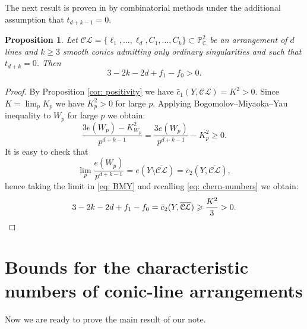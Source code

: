 \documentclass[12pt]{amsart}
\theoremstyle{plain}
\newtheorem{proposition}[thm]{Proposition}
\theoremstyle{definition}
\renewcommand\ge{\geqslant}
\renewcommand\geq{\geqslant}
\newcommand\CL{\mathcal{CL}}
\newcommand\oCL{\overline{\mathcal{CL}}}
\begin{document}
The next result is proven in \cite[Proposition~6.2]{PSz2023} by combinatorial methods under the additional assumption that $t_{d+k-1}=0$.
\begin{proposition}\label{prop: c2}
Let $\mathcal{CL} = \{\ell_{1}, \dots, \ell_{d}, C_{1}, \dots, C_{k}\} \subset \mathbb{P}^{2}_{\mathbb{C}}$ be an arrangement of $d$ lines and $k\geq 3$ smooth conics admitting only ordinary singularities and such that $t_{d+k}=0$. 
Then
  $$3-2k-2d+f_{1}-f_{0}>0.$$
\end{proposition}
\begin{proof} By Proposition  \ref{cor: positivity} we have $\bar c_1(Y,\CL)=K^2>0$. Since $K=\lim_pK_p$ we have $K_p^2>0$ for large $p$. Applying Bogomolov--Miyaoka--Yau inequality to $W_p$ for large $p$ we obtain:
\begin{equation}\label{eq: BMY}
\frac{3e(W_p)-K_{W_p}^2}{p^{d+k-1}}=\frac{3e(W_p)}{p^{d+k-1}}-K_p^2\ge 0.
\end{equation}
It is easy to check that $$\lim_p \frac{e(W_p)}{p^{d+k-1}}=e(Y\setminus \oCL)=\bar c_2(Y,\oCL),$$ hence  
taking the limit in \eqref{eq: BMY} and recalling \eqref{eq: chern-numbers} we obtain:
\begin{equation*}
3-2k-2d+f_{1}-f_{0} = \bar c_2(Y,\oCL)\ge\frac{K^2}{3}>0. \qedhere{}
\end{equation*}
\qedhere\end{proof}



\section{Bounds for the characteristic numbers of conic-line arrangements}\label{sec:bounds}
Now we are ready to prove the main result of our note.
\end{document}
